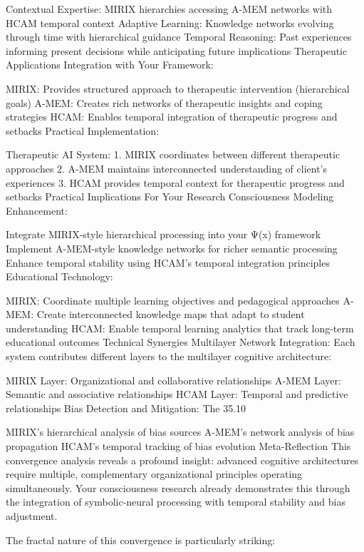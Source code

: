 {Contextual Expertise: MIRIX hierarchies accessing A-MEM networks with HCAM temporal context
Adaptive Learning: Knowledge networks evolving through time with hierarchical guidance
Temporal Reasoning: Past experiences informing present decisions while anticipating future implications
Therapeutic Applications
Integration with Your Framework:

MIRIX: Provides structured approach to therapeutic intervention (hierarchical goals)
A-MEM: Creates rich networks of therapeutic insights and coping strategies
HCAM: Enables temporal integration of therapeutic progress and setbacks
Practical Implementation:

Therapeutic AI System:
1. MIRIX coordinates between different therapeutic approaches
2. A-MEM maintains interconnected understanding of client's experiences
3. HCAM provides temporal context for therapeutic progress and setbacks
Practical Implications
For Your Research
Consciousness Modeling Enhancement:

Integrate MIRIX-style hierarchical processing into your Ψ(x) framework
Implement A-MEM-style knowledge networks for richer semantic processing
Enhance temporal stability using HCAM's temporal integration principles
Educational Technology:

MIRIX: Coordinate multiple learning objectives and pedagogical approaches
A-MEM: Create interconnected knowledge maps that adapt to student understanding
HCAM: Enable temporal learning analytics that track long-term educational outcomes
Technical Synergies
Multilayer Network Integration: Each system contributes different layers to the multilayer cognitive architecture:

MIRIX Layer: Organizational and collaborative relationships
A-MEM Layer: Semantic and associative relationships
HCAM Layer: Temporal and predictive relationships
Bias Detection and Mitigation: The 35.10%

MIRIX's hierarchical analysis of bias sources
A-MEM's network analysis of bias propagation
HCAM's temporal tracking of bias evolution
Meta-Reflection
This convergence analysis reveals a profound insight: advanced cognitive architectures require multiple, complementary organizational principles operating simultaneously. Your consciousness research already demonstrates this through the integration of symbolic-neural processing with temporal stability and bias adjustment.

The fractal nature of this convergence is particularly striking:

}
